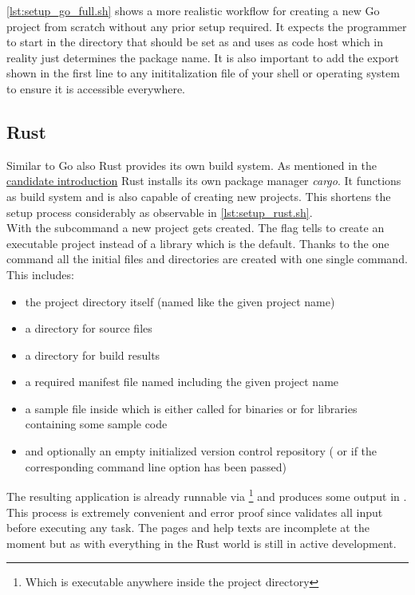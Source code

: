\autoref{lst:setup_go_full.sh} shows a more realistic workflow for creating a new Go project from scratch without any prior setup required. It expects the programmer to start in the directory that should be set as  and uses \href{https://www.github.com}{} as code host which in reality just determines the package name. It is also important to add the export shown in the first line to any inititalization file of your shell or operating system to ensure it is accessible everywhere.
\\


\subsection{Rust}
\label{subsec:Implementation::Setup::Rust}

Similar to Go also Rust provides its own build system. As mentioned in the \hyperref[subsec:State_of_the_art::Candidates::Rust]{candidate introduction} Rust installs its own package manager \textit{cargo}. It functions as build system and is also capable of creating new projects. This shortens the setup process considerably as observable in \autoref{lst:setup_rust.sh}.
\\


With the  subcommand a new project gets created. The  flag tells  to create an executable project instead of a library which is the default.
Thanks to the one command all the initial files and directories are created with one single command. This includes:
\begin{itemize}
    \item{the project directory itself (named like the given project name)}
    \item{a  directory for source files}
    \item{a  directory for build results}
    \item{a required manifest file named  including the given project name}
	\item{a sample file inside  which is either called  for binaries or  for libraries containing some sample code}
    \item{and optionally an empty initialized version control repository ( or  if the corresponding command line option has been passed)}
\end{itemize}
The resulting application is already runnable via \footnote{Which is executable anywhere inside the project directory} and produces some output in . This process is extremely convenient and error proof since  validates all input before executing any task. The  pages and help texts are incomplete at the moment but as with everything in the Rust world  is still in active development.

